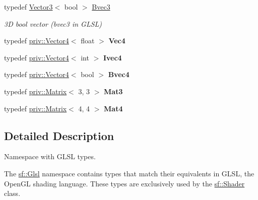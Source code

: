 \begin{DoxyCompactItemize}
typedef \mbox{\hyperlink{classsf_1_1_vector3}{Vector3}}$<$ bool $>$ \mbox{\hyperlink{namespacesf_1_1_glsl_a4166ffc506619b4912d576e6eba2c957}{Bvec3}}
\begin{DoxyCompactList}\small\item\em 3D bool vector ({\ttfamily bvec3} in G\+L\+SL) \end{DoxyCompactList}\item 
\mbox{\label{namespacesf_1_1_glsl_a862f8df4771d2403de28653328fac5d0}} 
typedef \mbox{\hyperlink{structsf_1_1priv_1_1_vector4}{priv\+::\+Vector4}}$<$ float $>$ {\bfseries Vec4}
\item 
\mbox{\label{namespacesf_1_1_glsl_abcba8791f75382199ea03f6932a91d9b}} 
typedef \mbox{\hyperlink{structsf_1_1priv_1_1_vector4}{priv\+::\+Vector4}}$<$ int $>$ {\bfseries Ivec4}
\item 
\mbox{\label{namespacesf_1_1_glsl_a5f4f38e06558ae1baa610b119e45ea0b}} 
typedef \mbox{\hyperlink{structsf_1_1priv_1_1_vector4}{priv\+::\+Vector4}}$<$ bool $>$ {\bfseries Bvec4}
\item 
\mbox{\label{namespacesf_1_1_glsl_a1bf4595b60b08c79473a882e2c1dbff8}} 
typedef \mbox{\hyperlink{structsf_1_1priv_1_1_matrix}{priv\+::\+Matrix}}$<$ 3, 3 $>$ {\bfseries Mat3}
\item 
\mbox{\label{namespacesf_1_1_glsl_aab545f0a373a3ea8ad145811b747f3e4}} 
typedef \mbox{\hyperlink{structsf_1_1priv_1_1_matrix}{priv\+::\+Matrix}}$<$ 4, 4 $>$ {\bfseries Mat4}
\end{DoxyCompactItemize}


\subsection{Detailed Description}
Namespace with G\+L\+SL types. 

\begin{DoxyVerb}\end{DoxyVerb}


The \mbox{\hyperlink{namespacesf_1_1_glsl}{sf\+::\+Glsl}} namespace contains types that match their equivalents in G\+L\+SL, the Open\+GL shading language. These types are exclusively used by the \mbox{\hyperlink{classsf_1_1_shader}{sf\+::\+Shader}} class.

